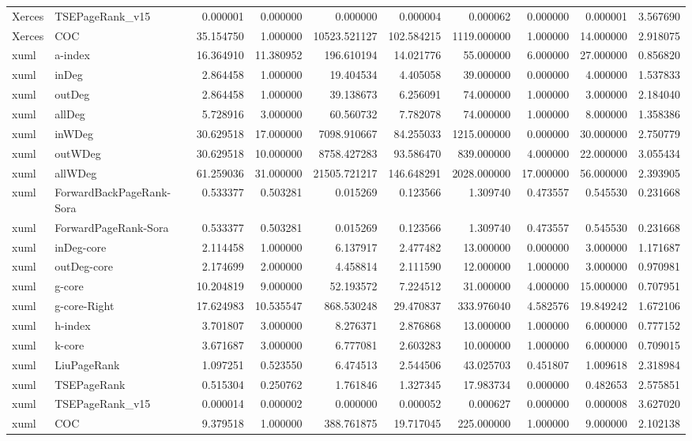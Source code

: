 \begin{tabular}{llrrrrrrrr}
Xerces & TSEPageRank_v15 & 0.000001 & 0.000000 & 0.000000 & 0.000004 & 0.000062 & 0.000000 & 0.000001 & 3.567690 \\
Xerces & COC & 35.154750 & 1.000000 & 10523.521127 & 102.584215 & 1119.000000 & 1.000000 & 14.000000 & 2.918075 \\
xuml & a-index & 16.364910 & 11.380952 & 196.610194 & 14.021776 & 55.000000 & 6.000000 & 27.000000 & 0.856820 \\
xuml & inDeg & 2.864458 & 1.000000 & 19.404534 & 4.405058 & 39.000000 & 0.000000 & 4.000000 & 1.537833 \\
xuml & outDeg & 2.864458 & 1.000000 & 39.138673 & 6.256091 & 74.000000 & 1.000000 & 3.000000 & 2.184040 \\
xuml & allDeg & 5.728916 & 3.000000 & 60.560732 & 7.782078 & 74.000000 & 1.000000 & 8.000000 & 1.358386 \\
xuml & inWDeg & 30.629518 & 17.000000 & 7098.910667 & 84.255033 & 1215.000000 & 0.000000 & 30.000000 & 2.750779 \\
xuml & outWDeg & 30.629518 & 10.000000 & 8758.427283 & 93.586470 & 839.000000 & 4.000000 & 22.000000 & 3.055434 \\
xuml & allWDeg & 61.259036 & 31.000000 & 21505.721217 & 146.648291 & 2028.000000 & 17.000000 & 56.000000 & 2.393905 \\
xuml & ForwardBackPageRank-Sora & 0.533377 & 0.503281 & 0.015269 & 0.123566 & 1.309740 & 0.473557 & 0.545530 & 0.231668 \\
xuml & ForwardPageRank-Sora & 0.533377 & 0.503281 & 0.015269 & 0.123566 & 1.309740 & 0.473557 & 0.545530 & 0.231668 \\
xuml & inDeg-core & 2.114458 & 1.000000 & 6.137917 & 2.477482 & 13.000000 & 0.000000 & 3.000000 & 1.171687 \\
xuml & outDeg-core & 2.174699 & 2.000000 & 4.458814 & 2.111590 & 12.000000 & 1.000000 & 3.000000 & 0.970981 \\
xuml & g-core & 10.204819 & 9.000000 & 52.193572 & 7.224512 & 31.000000 & 4.000000 & 15.000000 & 0.707951 \\
xuml & g-core-Right & 17.624983 & 10.535547 & 868.530248 & 29.470837 & 333.976040 & 4.582576 & 19.849242 & 1.672106 \\
xuml & h-index & 3.701807 & 3.000000 & 8.276371 & 2.876868 & 13.000000 & 1.000000 & 6.000000 & 0.777152 \\
xuml & k-core & 3.671687 & 3.000000 & 6.777081 & 2.603283 & 10.000000 & 1.000000 & 6.000000 & 0.709015 \\
xuml & LiuPageRank & 1.097251 & 0.523550 & 6.474513 & 2.544506 & 43.025703 & 0.451807 & 1.009618 & 2.318984 \\
xuml & TSEPageRank & 0.515304 & 0.250762 & 1.761846 & 1.327345 & 17.983734 & 0.000000 & 0.482653 & 2.575851 \\
xuml & TSEPageRank_v15 & 0.000014 & 0.000002 & 0.000000 & 0.000052 & 0.000627 & 0.000000 & 0.000008 & 3.627020 \\
xuml & COC & 9.379518 & 1.000000 & 388.761875 & 19.717045 & 225.000000 & 1.000000 & 9.000000 & 2.102138 \\
\bottomrule
\end{tabular}
